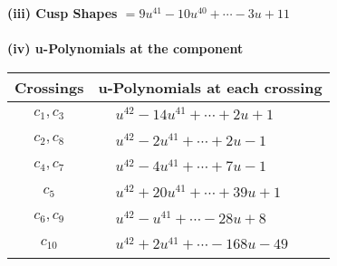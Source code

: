 \documentclass[1p]{elsarticle_modified}
\theoremstyle{definition}
\begin{document}
\flushleft \textbf{(iii) Cusp Shapes $= 9 u^{41}-10 u^{40}+\cdots-3 u+11$}\\~\\
\newpage\renewcommand{\arraystretch}{1}
\flushleft \textbf{(iv) u-Polynomials at the component}\newline \\
\begin{tabular}{m{50pt}|m{274pt}}
Crossings & \hspace{64pt}u-Polynomials at each crossing \\
\hline $$\begin{aligned}c_{1},c_{3}\end{aligned}$$&$\begin{aligned}
&u^{42}-14 u^{41}+\cdots+2 u+1
\end{aligned}$\\
\hline $$\begin{aligned}c_{2},c_{8}\end{aligned}$$&$\begin{aligned}
&u^{42}-2 u^{41}+\cdots+2 u-1
\end{aligned}$\\
\hline $$\begin{aligned}c_{4},c_{7}\end{aligned}$$&$\begin{aligned}
&u^{42}-4 u^{41}+\cdots+7 u-1
\end{aligned}$\\
\hline $$\begin{aligned}c_{5}\end{aligned}$$&$\begin{aligned}
&u^{42}+20 u^{41}+\cdots+39 u+1
\end{aligned}$\\
\hline $$\begin{aligned}c_{6},c_{9}\end{aligned}$$&$\begin{aligned}
&u^{42}- u^{41}+\cdots-28 u+8
\end{aligned}$\\
\hline $$\begin{aligned}c_{10}\end{aligned}$$&$\begin{aligned}
&u^{42}+2 u^{41}+\cdots-168 u-49
\end{aligned}$\\
\hline
\end{tabular}\\~\\
\newpage\renewcommand{\arraystretch}{1}
\end{document}
